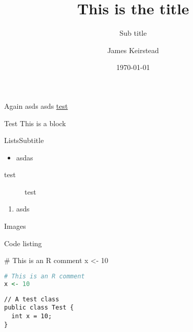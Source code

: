 
\title{This is the title}
\subtitle{Sub title}
\date{\today}
\author{James Keirstead}

\usepackage{lipsum}



\begin{frame}
\maketitle
\end{frame}

\lipsum[1]

\begin{frame}{Again}
asds \pause
asds \url{test}

\begin{block}{Test}
This is a block
\end{block}
\end{frame}

\lipsum[2]
\begin{frame}{Lists}{Subtitle}
\begin{itemize}
\item asdas
\end{itemize}

\begin{description}
\item [test] test
\end{description}

\begin{enumerate}
\item asds
\end{enumerate}
\end{frame}


\lipsum[3]

\begin{frame}{Images}


\end{frame}

\lipsum[4]

\begin{frame}[fragile]{Code listing}

\begin{rcode}
# This is an R comment
x <- 10
\end{rcode}

\begin{lstlisting}[language=R]
# This is an R comment
x <- 10
\end{lstlisting}

\begin{lstlisting}
// A test class
public class Test {
  int x = 10;
}
\end{lstlisting}
\end{frame}


